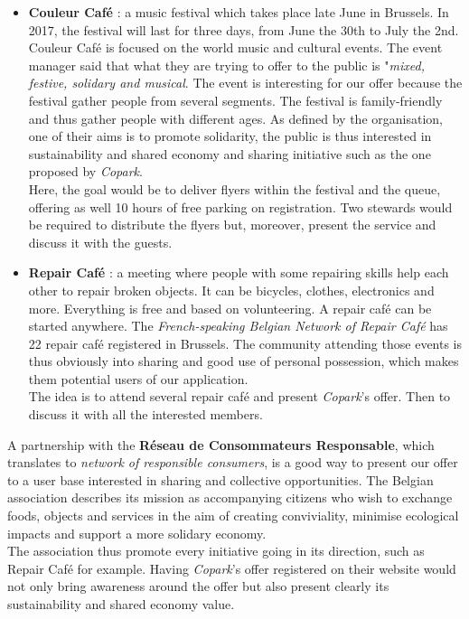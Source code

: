 \documentclass[12pt,a4paper,oneside]{book}
\newcommand{\bp}{\textit{Copark}}
\begin{document}
\begin{itemize}
\item \textbf{Couleur Café} : a music festival which takes place late June in Brussels. In 2017, the festival will last for three days, from June the 30th to July the 2nd. Couleur Café is focused on the world music and cultural events. The event manager said that what they are trying to offer to the public is "\textit{mixed, festive, solidary and musical}. The event is interesting for our offer because the festival gather people from several segments. The festival is family-friendly and thus gather people with different ages. As defined by the organisation, one of their aims is to promote solidarity, the public is thus interested in sustainability and shared economy and sharing initiative such as the one proposed by \bp{}.\\
Here, the goal would be to deliver flyers within the festival and the queue, offering as well 10 hours of free parking on registration. Two stewards would be required to distribute the flyers but, moreover, present the service and discuss it with the guests.
\item \textbf{Repair Café} : a meeting where people with some repairing skills help each other to repair broken objects. It can be bicycles, clothes, electronics and more. Everything is free and based on volunteering. A repair café can be started anywhere. The \textit{French-speaking Belgian Network of Repair Café} has 22 repair café registered in Brussels.\cite{repair} The community attending those events is thus obviously into sharing and good use of personal possession, which makes them potential users of our application.\\
The idea is to attend several repair café and present \bp{}'s offer. Then to discuss it with all the interested members.
\end{itemize}

A partnership with the \textbf{Réseau de Consommateurs Responsable}, which translates to \textit{network of responsible consumers}, is a good way to present our offer to a user base interested in sharing and collective opportunities. The Belgian association describes its mission as accompanying citizens who wish to exchange foods, objects and services in the aim of creating conviviality, minimise ecological impacts and support a more solidary economy.\cite{rcr}\\

The association thus promote every initiative going in its direction, such as Repair Café for example. Having \bp{}'s offer registered on their website would not only bring awareness around the offer but also present clearly its sustainability and shared economy value.
\end{document}
